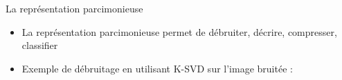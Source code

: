 \begin{frame}{La représentation parcimonieuse}
\begin{itemize}
\item La représentation parcimonieuse permet de débruiter, décrire, compresser, classifier
\item Exemple de débruitage en utilisant K-SVD sur l'image bruitée :
	\begin{figure}\centering
	\end{figure}
\end{itemize}
\end{frame}


